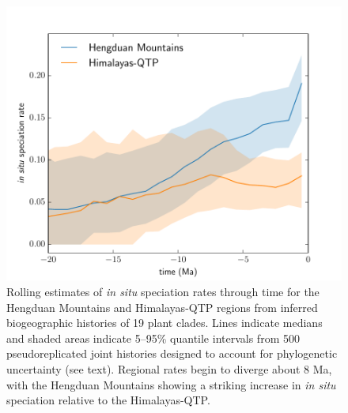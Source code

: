 \documentclass[9pt,twocolumn,twoside,lineno]{pnas-new}
\begin{document}
\begin{figure}
\centering
\includegraphics[width=.99\linewidth]{speciation_rates.pdf}
\caption{Rolling estimates of \textit{in situ} speciation rates
  through time for the Hengduan Mountains and Himalayas-QTP regions
  from inferred biogeographic histories of 19 plant clades. Lines
  indicate medians and shaded areas indicate 5--95\% quantile
  intervals from 500 pseudoreplicated joint histories designed to
  account for phylogenetic uncertainty (see text). Regional rates
  begin to diverge about 8 Ma, with the Hengduan Mountains showing a
  striking increase in \textit{in situ} speciation relative to the
  Himalayas-QTP.}
\label{fig:speciation}
\end{figure}
\end{document}
